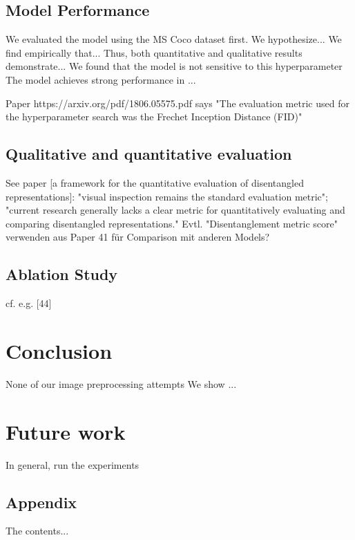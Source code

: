 \documentclass[10pt,letterpaper]{article}
\begin{document}
\subsection{Model Performance}
We evaluated the model using the MS Coco dataset first.
We hypothesize...
We find empirically that...
Thus, both quantitative and qualitative results demonstrate...
We found that the model is not sensitive to this hyperparameter
The model achieves strong performance in ...

\par Paper https://arxiv.org/pdf/1806.05575.pdf says "The evaluation metric used for the hyperparameter search was the Frechet Inception Distance (FID)"

\subsection{Qualitative and quantitative evaluation}
See paper [a framework for the quantitative evaluation of disentangled representations]: "visual inspection remains the standard evaluation
metric"; "current research generally lacks a clear metric for quantitatively evaluating and comparing disentangled representations."
Evtl. "Disentanglement metric score" verwenden aus Paper 41 für Comparison mit anderen Models?

\subsection{Ablation Study}
cf. e.g. [44]

\section{Conclusion}
None of our image preprocessing attempts
We show ...

\section{Future work}
In general, run the experiments

\printbibliography

\begin{appendices}
\section{Appendix}
The contents...
\end{appendices}
\end{document}

